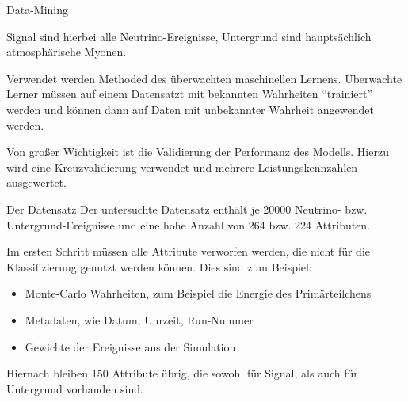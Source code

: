 \documentclass[t]{beamer}
\begin{document}
\begin{columns}[onlytextwidth]
\begin{column}{0.5\textwidth}
\begin{block}{Data-Mining}
\begin{multicols}{2}
          Signal sind hierbei alle Neutrino-Ereignisse, Untergrund sind hauptsächlich
          atmosphärische Myonen.

          Verwendet werden Methoded des überwachten maschinellen Lernens.
          Überwachte Lerner müssen auf einem Datensatzt mit bekannten Wahrheiten
          \enquote{trainiert} werden und können dann auf Daten mit unbekannter 
          Wahrheit angewendet werden.

          Von großer Wichtigkeit ist die Validierung der Performanz des Modells.
          Hierzu wird eine Kreuzvalidierung verwendet und mehrere Leistungskennzahlen
          ausgewertet.
        \end{multicols}
      \end{block}%

      \begin{block}{Der Datensatz}
      Der untersuchte Datensatz enthält je \num{20000} Neutrino- bzw. Untergrund-Ereignisse
      und eine hohe Anzahl von 264 bzw. 224 Attributen.

      Im ersten Schritt müssen alle Attribute verworfen werden, die nicht für
      die Klassifizierung genutzt werden können.
      Dies sind zum Beispiel:
      \begin{itemize}
        \item Monte-Carlo Wahrheiten, zum Beispiel die Energie des Primärteilchens
        \item Metadaten, wie Datum, Uhrzeit, Run-Nummer
        \item Gewichte der Ereignisse aus der Simulation
      \end{itemize}

      Hiernach bleiben 150 Attribute übrig, die sowohl für Signal, als auch für
      Untergrund vorhanden sind.
      \end{block}


\end{column}
\end{columns}
\end{document}
